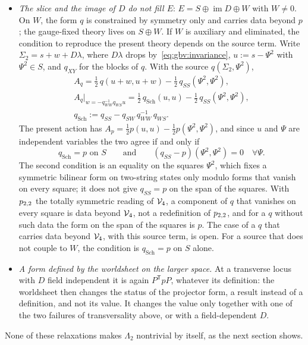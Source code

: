 \begin{itemize}
  \item \emph{The slice and the image of $D$ do not fill $E$}: $E = S \oplus \operatorname{im} D \oplus W$ with $W \neq 0$.
    On $W$, the form $q$ is constrained by symmetry only and carries data beyond $p$; the gauge-fixed theory lives on $S \oplus W$.
    If $W$ is auxiliary and eliminated, the condition to reproduce the present theory depends on the source term.
    Write $\Sigma_2 = s + w + D \lambda$, where $D \lambda$ drops by~\eqref{eq:gbv:invariance}, $u := s - \Psi^2$ with $\Psi^2 \in S$, and $q_{XY}$ for the blocks of $q$.
    With the source $q(\Sigma_2, \Psi^2)$,
    \begin{equation}
      \label{eq:gbv:eliminate-w}
      \begin{gathered}
        A_q
          = \frac{1}{2} \, q(u + w, u + w)
            - \frac{1}{2} \, q_{SS}(\Psi^2, \Psi^2),
        \\
        A_q \big\vert_{w = - q_{WW}^{-1} q_{WS} u}
          = \frac{1}{2} \, q_{\mathrm{Sch}}(u, u)
            - \frac{1}{2} \, q_{SS}(\Psi^2, \Psi^2),
        \\
        q_{\mathrm{Sch}}
          := q_{SS} - q_{SW} \, q_{WW}^{-1} \, q_{WS}.
      \end{gathered}
    \end{equation}
    The present action has $A_p = \tfrac12 p(u, u) - \tfrac12 p(\Psi^2, \Psi^2)$, and since $u$ and $\Psi$ are independent variables the two agree if and only if
    \begin{equation}
      \label{eq:gbv:eliminate-w-condition}
      q_{\mathrm{Sch}}
        = p
      \text{ on } S
      \qquad \text{and} \qquad
      (q_{SS} - p)(\Psi^2, \Psi^2)
        = 0
      \quad
      \forall \Psi.
    \end{equation}
    The second condition is an equality on the squares $\Psi^2$, which fixes a symmetric bilinear form on two-string states only modulo forms that vanish on every square; it does not give $q_{SS} = p$ on the span of the squares.
    With $p_{2,2}$ the totally symmetric reading of $\mathcal{V}_{4}$, a component of $q$ that vanishes on every square is data beyond $\mathcal{V}_{4}$, not a redefinition of $p_{2,2}$, and for a $q$ without such data the form on the span of the squares is $p$.
    The case of a $q$ that carries data beyond $\mathcal{V}_{4}$, with this source term, is open.
    For a source that does not couple to $W$, the condition is $q_{\mathrm{Sch}} = p$ on $S$ alone.

  \item \emph{A form defined by the worldsheet on the larger space.} At a transverse locus with $D$ field independent it is again $P^{\mathsf T} p P$, whatever its definition: the worldsheet then changes the status of the projector form, a result instead of a definition, and not its value.
    It changes the value only together with one of the two failures of transversality above, or with a field-dependent $D$.
\end{itemize}
None of these relaxations makes $\Lambda_2$ nontrivial by itself, as the next section shows.

